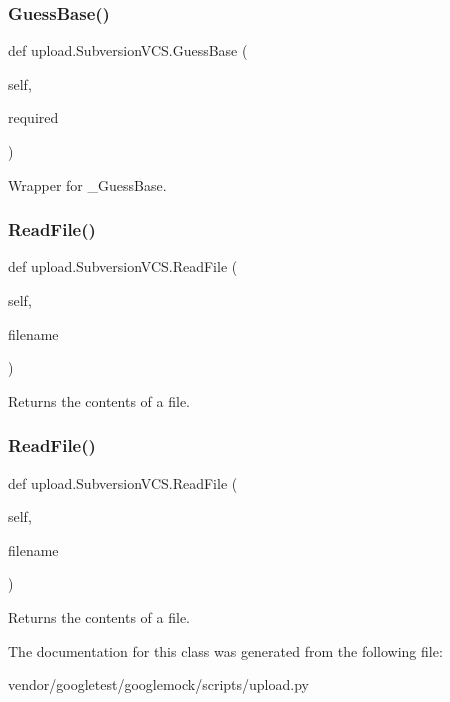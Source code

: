 \subsubsection{\texorpdfstring{Guess\+Base()}{GuessBase()}\hspace{0.1cm}{\footnotesize\ttfamily [2/2]}}
{\footnotesize\ttfamily def upload.\+Subversion\+V\+C\+S.\+Guess\+Base (\begin{DoxyParamCaption}\item[{}]{self,  }\item[{}]{required }\end{DoxyParamCaption})}

\begin{DoxyVerb}Wrapper for _GuessBase.\end{DoxyVerb}
 \mbox{\label{classupload_1_1_subversion_v_c_s_a340d269b74386ac863636f6b0683d9f4}} 
\subsubsection{\texorpdfstring{Read\+File()}{ReadFile()}\hspace{0.1cm}{\footnotesize\ttfamily [1/2]}}
{\footnotesize\ttfamily def upload.\+Subversion\+V\+C\+S.\+Read\+File (\begin{DoxyParamCaption}\item[{}]{self,  }\item[{}]{filename }\end{DoxyParamCaption})}

\begin{DoxyVerb}Returns the contents of a file.\end{DoxyVerb}
 \mbox{\label{classupload_1_1_subversion_v_c_s_a340d269b74386ac863636f6b0683d9f4}} 
\subsubsection{\texorpdfstring{Read\+File()}{ReadFile()}\hspace{0.1cm}{\footnotesize\ttfamily [2/2]}}
{\footnotesize\ttfamily def upload.\+Subversion\+V\+C\+S.\+Read\+File (\begin{DoxyParamCaption}\item[{}]{self,  }\item[{}]{filename }\end{DoxyParamCaption})}

\begin{DoxyVerb}Returns the contents of a file.\end{DoxyVerb}
 

The documentation for this class was generated from the following file\+:\begin{DoxyCompactItemize}
\item 
vendor/googletest/googlemock/scripts/upload.\+py\end{DoxyCompactItemize}
